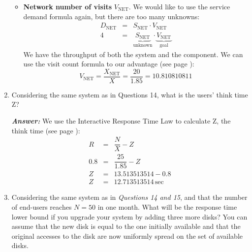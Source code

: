 \begin{enumerate}
\begin{itemize}
        \item \textbf{Network number of visits} $V_{\text{NET}}$. We would like to use the service demand formula again, but there are too many unknowns:
        \begin{equation*}
            \begin{array}{rcl}
                D_{\text{NET}} &=& S_{\text{NET}} \cdot V_{\text{NET}} \\ [.5em]
                4 &=& \underbrace{S_{\text{NET}}}_{\text{unknown}} \cdot \underbrace{V_{\text{NET}}}_{\text{goal}}
            \end{array}
        \end{equation*}
        We have the throughput of both the system and the component. We can use the visit count formula to our advantage (see page \pageref{eq: Visit Count}):
        \begin{equation*}
            V_{\text{NET}} = \dfrac{X_{\text{NET}}}{X} = \dfrac{20}{1.85} = \mathbf{10.81}0810811
        \end{equation*}
    \end{itemize}

    \item Considering the same system as in Questions 14, what is the users' think time Z?
    
    \textcolor{Green3}{\textbf{\emph{Answer:}}} We use the Interactive Response Time Law to calculate Z, the think time (see page \pageref{paragraph: Interactive Response Time Law}):
    \begin{equation*}
        \begin{array}{rcl}
            R &=& \dfrac{N}{X} - Z \\ [1.1em]
            0.8 &=& \dfrac{25}{1.85} - Z \\ [1.1em]
            Z &=& 13.513513514 - 0.8 \\ [.5em]
            Z &=& \mathbf{12.7135}13514 \, \text{sec}
        \end{array}
    \end{equation*}


    \newpage


    \item Considering the same system as in \emph{Questions 14 and 15}, and that the number of end-users reaches $N = 50$ in one month. What will be the response time lower bound if you upgrade your system by adding three more disks? You can assume that the new disk is equal to the one initially available and that the original accesses to the disk are now uniformly spread on the set of available disks.


\end{enumerate}
